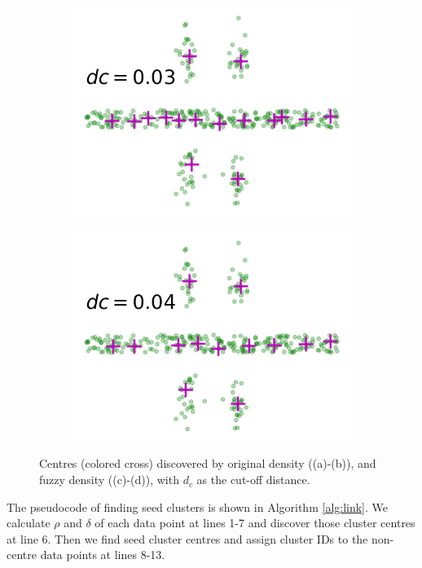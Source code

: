 \documentclass{llncs}
\begin{document}
\begin{figure}[ht]
\begin{subfigure}[t]{0.24\textwidth}
\includegraphics[width=1\textwidth]{image/003nl.png}
\end{subfigure}
\begin{subfigure}[t]{0.24\textwidth}
\centering
\includegraphics[width=1\textwidth]{image/004nl.png}
\end{subfigure}
\caption{Centres (colored cross) discovered by original density ((a)-(b)), and fuzzy density ((c)-(d)), with $d_{c}$ as the cut-off distance.}
\label{fig:link}
\end{figure}
The pseudocode of finding seed clusters is shown in Algorithm \ref{alg:link}. We calculate $\rho$ and $\delta$ of each data point at lines 1-7 and discover those cluster centres at line 6. Then we find seed cluster centres and assign cluster IDs to the non-centre data points at lines 8-13.
\end{document}
